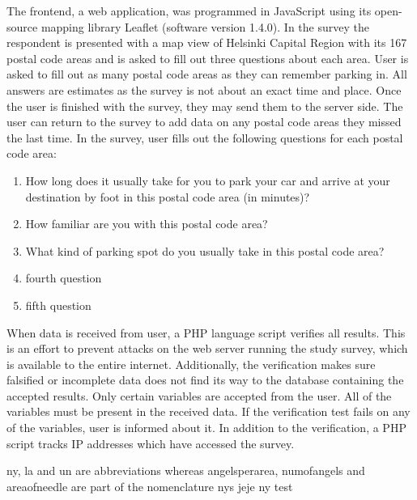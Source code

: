 The frontend, a web application, was programmed in JavaScript using its open-source mapping library Leaflet (software version 1.4.0). In the survey the respondent is presented with a map view of Helsinki Capital Region with its 167 postal code areas and is asked to fill out three questions about each area. User is asked to fill out as many postal code areas as they can remember parking in. All answers are estimates as the survey is not about an exact time and place. Once the user is finished with the survey, they may send them to the server side. The user can return to the survey to add data on any postal code areas they missed the last time. In the survey, user fills out the following questions for each postal code area:

\begin{spacing}{1}
    \begin{enumerate}
      \item How long does it usually take for you to park your car and arrive at your destination by foot in this postal code area (in minutes)?
      \item How familiar are you with this postal code area?
      \item What kind of parking spot do you usually take in this postal code area?
      \item fourth question
      \item fifth question
    \end{enumerate}
\end{spacing}

\noindent
When data is received from user, a PHP language script verifies all results. This is an effort to prevent attacks on the web server running the study survey, which is available to the entire internet. Additionally, the verification makes sure falsified or incomplete data does not find its way to the database containing the accepted results. Only certain variables are accepted from the user. All of the variables must be present in the received data. If the verification test fails on any of the variables, user is informed about it. In addition to the verification, a PHP script tracks IP addresses which have accessed the survey.

\gls{ny}, \gls{la} and \gls{un} are abbreviations whereas \gls{angelsperarea}, \gls{numofangels} and \gls{areaofneedle} are part of the nomenclature
\glspl{ny} jeje \gls{ny} test

